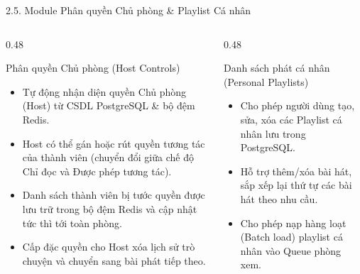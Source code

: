 \documentclass[aspectratio=169,11pt]{beamer}
\begin{document}
\begin{frame}{2.5. Module Phân quyền Chủ phòng \& Playlist Cá nhân}
    \begin{columns}[T]
        \begin{column}{0.48\textwidth}
            \begin{block}{Phân quyền Chủ phòng (Host Controls)}
                \small
                \begin{itemize}
                    \item Tự động nhận diện quyền Chủ phòng (Host) từ CSDL PostgreSQL \& bộ đệm Redis.
                    \item Host có thể gán hoặc rút quyền tương tác của thành viên (chuyển đổi giữa chế độ Chỉ đọc và Được phép tương tác).
                    \item Danh sách thành viên bị tước quyền được lưu trữ trong bộ đệm Redis và cập nhật tức thì tới toàn phòng.
                    \item Cấp đặc quyền cho Host xóa lịch sử trò chuyện và chuyển sang bài phát tiếp theo.
                \end{itemize}
            \end{block}
        \end{column}

        \begin{column}{0.48\textwidth}
            \begin{block}{Danh sách phát cá nhân (Personal Playlists)}
                \small
                \begin{itemize}
                    \item Cho phép người dùng tạo, sửa, xóa các Playlist cá nhân lưu trong PostgreSQL.
                    \item Hỗ trợ thêm/xóa bài hát, sắp xếp lại thứ tự các bài hát theo nhu cầu.
                    \item Cho phép nạp hàng loạt (Batch load) playlist cá nhân vào Queue phòng xem.
                \end{itemize}
            \end{block}
        \end{column}
    \end{columns}
\end{frame}
\end{document}
